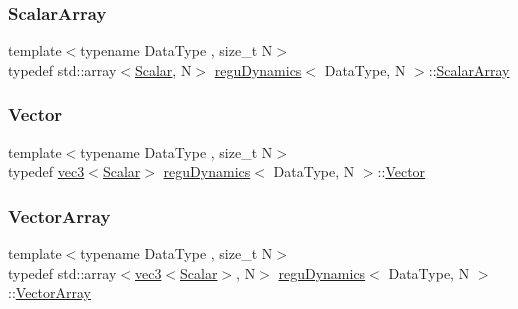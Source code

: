 \mbox{\label{classregu_dynamics_a34b4b77ea3e49e1cdef584ec8bd281dc}} 
\subsubsection{\texorpdfstring{Scalar\+Array}{ScalarArray}}
{\footnotesize\ttfamily template$<$typename Data\+Type , size\+\_\+t N$>$ \\
typedef std\+::array$<$\mbox{\hyperlink{classregu_dynamics_a359c55370b4dee032396f0df86ad5fab}{Scalar}}, N$>$ \mbox{\hyperlink{classregu_dynamics}{regu\+Dynamics}}$<$ Data\+Type, N $>$\+::\mbox{\hyperlink{classregu_dynamics_a34b4b77ea3e49e1cdef584ec8bd281dc}{Scalar\+Array}}}

\mbox{\label{classregu_dynamics_a454c165b5e838c6b44a3f18d6722a9e2}} 
\subsubsection{\texorpdfstring{Vector}{Vector}}
{\footnotesize\ttfamily template$<$typename Data\+Type , size\+\_\+t N$>$ \\
typedef \mbox{\hyperlink{structvec3}{vec3}}$<$\mbox{\hyperlink{classregu_dynamics_a359c55370b4dee032396f0df86ad5fab}{Scalar}}$>$ \mbox{\hyperlink{classregu_dynamics}{regu\+Dynamics}}$<$ Data\+Type, N $>$\+::\mbox{\hyperlink{classregu_dynamics_a454c165b5e838c6b44a3f18d6722a9e2}{Vector}}}

\mbox{\label{classregu_dynamics_a86a05253d927e1716f3401e887aa5c8e}} 
\subsubsection{\texorpdfstring{Vector\+Array}{VectorArray}}
{\footnotesize\ttfamily template$<$typename Data\+Type , size\+\_\+t N$>$ \\
typedef std\+::array$<$\mbox{\hyperlink{structvec3}{vec3}}$<$\mbox{\hyperlink{classregu_dynamics_a359c55370b4dee032396f0df86ad5fab}{Scalar}}$>$, N$>$ \mbox{\hyperlink{classregu_dynamics}{regu\+Dynamics}}$<$ Data\+Type, N $>$\+::\mbox{\hyperlink{classregu_dynamics_a86a05253d927e1716f3401e887aa5c8e}{Vector\+Array}}}



